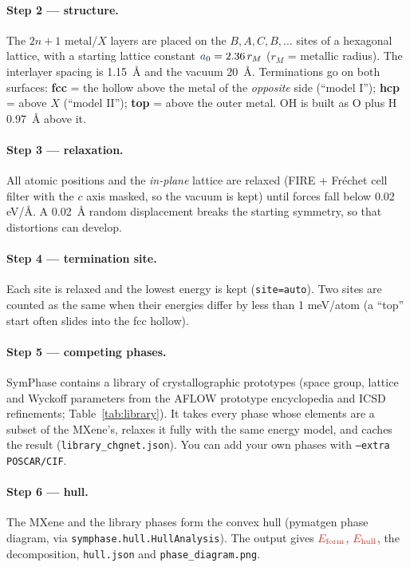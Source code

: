 \documentclass[11pt,a4paper]{article}
\newcommand{\Ef}{\textcolor{ecol}{E_{\mathrm{form}}}}
\newcommand{\Eh}{\textcolor{ecol}{E_{\mathrm{hull}}}}
\newcommand{\alat}{\textcolor{gcol}{a}}
\begin{document}
\paragraph{Step 2 --- structure.} The $2n+1$ metal/$X$ layers are placed on the $B,A,C,B,\dots$ sites of a hexagonal lattice, with a
starting lattice constant $\alat_0 = 2.36\,r_M$ ($r_M$ = metallic radius). The interlayer spacing is 1.15~Å and the vacuum 20~Å.
Terminations go on both surfaces:
\textbf{fcc} = the hollow above the metal of the \emph{opposite} side (``model I''); \textbf{hcp} = above $X$ (``model II'');
\textbf{top} = above the outer metal. OH is built as O plus H 0.97~Å above it.

\paragraph{Step 3 --- relaxation.} All atomic positions and the \emph{in-plane} lattice are relaxed (FIRE + Fréchet cell filter with
the $c$ axis masked, so the vacuum is kept) until forces fall below 0.02 eV/Å. A 0.02~Å random displacement breaks the
starting symmetry, so that distortions can develop.

\paragraph{Step 4 --- termination site.} Each site is relaxed and the lowest energy is kept (\texttt{site=auto}). Two sites
are counted as the same when their energies differ by less than 1 meV/atom (a ``top'' start often slides into the fcc hollow).

\paragraph{Step 5 --- competing phases.} SymPhase contains a library of crystallographic prototypes (space group, lattice and Wyckoff
parameters from the AFLOW prototype encyclopedia and ICSD refinements; Table~\ref{tab:library}). It takes every phase whose elements are a
subset of the MXene's, relaxes it fully with the same energy model, and caches the result (\texttt{library\_chgnet.json}). You can add
your own phases with \texttt{--extra POSCAR/CIF}.

\paragraph{Step 6 --- hull.} The MXene and the library phases form the convex hull (pymatgen phase diagram, via
\texttt{symphase.hull.HullAnalysis}). The output gives $\Ef$, $\Eh$, the decomposition, \texttt{hull.json} and \texttt{phase\_diagram.png}.
\end{document}
